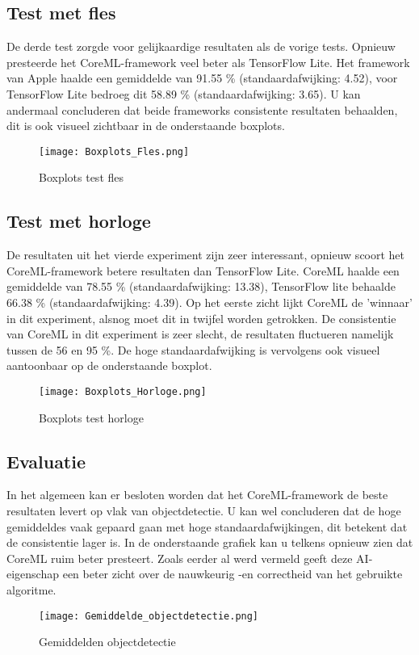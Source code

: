\subsection{Test met fles}
De derde test zorgde voor gelijkaardige resultaten als de vorige tests. Opnieuw presteerde het CoreML-framework veel beter als TensorFlow Lite. Het framework van Apple haalde een gemiddelde van 91.55 \% (standaardafwijking: 4.52), voor TensorFlow Lite bedroeg dit 58.89 \% (standaardafwijking: 3.65). U kan andermaal concluderen dat beide frameworks consistente resultaten behaalden, dit is ook visueel zichtbaar in de onderstaande boxplots. 
\begin{figure}[H]
	\centering
	\texttt{[image: Boxplots\_Fles.png]}
	\caption{Boxplots test fles}
\end{figure}
\subsection{Test met horloge}
De resultaten uit het vierde experiment zijn zeer interessant, opnieuw scoort het CoreML-framework betere resultaten dan TensorFlow Lite. CoreML haalde een gemiddelde van 78.55 \% (standaardafwijking: 13.38), TensorFlow lite behaalde 66.38 \% (standaardafwijking: 4.39). Op het eerste zicht lijkt CoreML de 'winnaar' in dit experiment, alsnog moet dit in twijfel worden getrokken. De consistentie van CoreML in dit experiment is zeer slecht, de resultaten fluctueren namelijk tussen de  56 en 95 \%. De hoge standaardafwijking is vervolgens ook visueel aantoonbaar op de onderstaande boxplot.
\begin{figure}[H]
	\centering
	\texttt{[image: Boxplots\_Horloge.png]}
	\caption{Boxplots test horloge}
\end{figure}
\subsection{Evaluatie}
In het algemeen kan er besloten worden dat het CoreML-framework de beste  resultaten levert op vlak van objectdetectie. U kan wel concluderen dat de hoge gemiddeldes vaak gepaard gaan met hoge standaardafwijkingen, dit betekent dat de consistentie lager is. In de onderstaande grafiek kan u telkens opnieuw zien dat CoreML ruim beter presteert. Zoals eerder al werd vermeld geeft deze AI-eigenschap een beter zicht over de nauwkeurig -en correctheid van het gebruikte algoritme.
\begin{figure}[H]
	\centering
	\texttt{[image: Gemiddelde\_objectdetectie.png]}
	\caption{Gemiddelden objectdetectie}
\end{figure}


